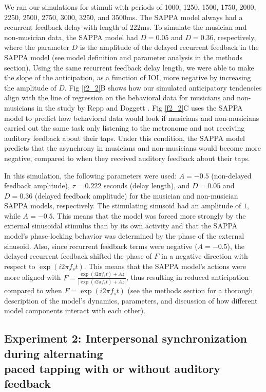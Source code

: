 \documentclass{report}
\begin{document}
We ran our simulations for stimuli with periods of 1000, 1250, 1500, 1750, 2000, 2250, 2500, 2750, 3000, 3250, and 3500ms. The SAPPA model always had a recurrent feedback delay with length of 222ms. To simulate the musician and non-musician data, the SAPPA model had $D = 0.05$ and $D = 0.36$, respectively, where the parameter $D$ is the amplitude of the delayed recurrent feedback in the SAPPA model (see model definition and parameter analysis in the methods section). Using the same recurrent feedback delay length, we were able to make the slope of the anticipation, as a function of IOI, more negative by increasing the amplitude of $D$. Fig \ref{f2_2}B shows how our simulated anticipatory tendencies align with the line of regression on the behavioral data for musicians and non-musicians in the study by Repp and Doggett \cite{repp2007tapping}. Fig \ref{f2_2}C uses the SAPPA model to predict how behavioral data would look if musicians and non-musicians carried out the same task only listening to the metronome and not receiving auditory feedback about their taps. Under this condition, the SAPPA model predicts that the asynchrony in musicians and non-musicians would become more negative, compared to when they received auditory feedback about their taps.

In this simulation, the following parameters were used: $A = -0.5$ (non-delayed feedback amplitude), $\tau = 0.222$ seconds (delay length), and $D = 0.05$ and $D = 0.36$ (delayed feedback amplitude) for the musician and non-musician SAPPA models, respectively. The stimulating sinusoid had an amplitude of $1$, while $A = -0.5$. This means that the model was forced more strongly by the external sinusoidal stimulus than by its own activity and that the SAPPA model's phase-locking behavior was determined by the phase of the external sinusoid. Also, since recurrent feedback terms were negative ($A = -0.5$), the delayed recurrent feedback shifted the phase of $F$ in a negative direction with respect to $\exp(i2\pi f_s t)$. This means that the SAPPA model's actions were more aligned with $F = \frac{\exp(i2\pi f_s t)+Az}{|\exp(i2\pi f_s t)+Az|}$, thus resulting in reduced anticipation compared to when $F = \exp(i2\pi f_s t)$ (see the methods section for a thorough description of the model's dynamics, parameters, and discussion of how different model components interact with each other).

\subsection{Experiment 2: Interpersonal synchronization during alternating \\ paced tapping with or without auditory feedback}
\end{document}
